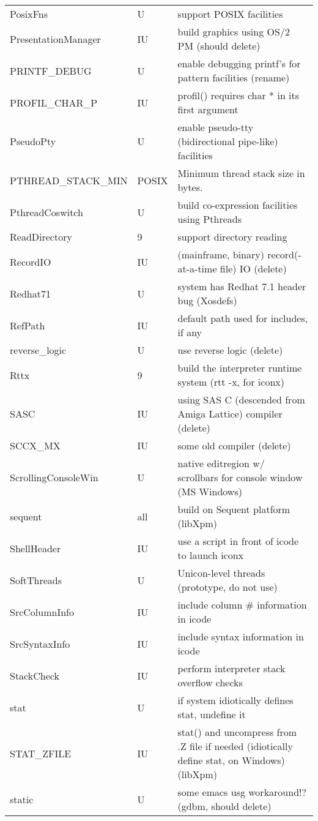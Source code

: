 \begin{xtabular}{|m{1.8in}|m{0.5in}|m{4.0in}|}
PosixFns & U & support POSIX facilities \\
PresentationManager & IU & build graphics using OS/2 PM (should delete) \\
PRINTF\_DEBUG & U & enable debugging printf's for pattern facilities (rename) \\
PROFIL\_CHAR\_P & IU & profil() requires char * in its first argument \\
PseudoPty & U & enable pseudo-tty (bidirectional pipe-like) facilities \\
PTHREAD\_STACK\_MIN & POSIX & Minimum thread stack size in bytes. \\
PthreadCoswitch & U & build co-expression facilities using Pthreads \\
ReadDirectory & 9 & support directory reading \\
RecordIO & IU & (mainframe, binary) record(-at-a-time file) IO (delete) \\
Redhat71 & U & system has Redhat 7.1 header bug (Xosdefs) \\
RefPath & IU & default path used for includes, if any \\
reverse\_logic & U & use reverse logic (delete) \\
Rttx & 9 & build the interpreter runtime system (rtt -x, for iconx) \\
SASC & IU & using SAS C (descended from Amiga Lattice) compiler (delete) \\
SCCX\_MX & IU & some old compiler (delete) \\
ScrollingConsoleWin & U & native editregion w/ scrollbars for console window (MS Windows) \\
sequent & all & build on Sequent platform (libXpm) \\
ShellHeader & IU & use a script in front of icode to launch iconx \\
SoftThreads & U & Unicon-level threads (prototype, do not use) \\
SrcColumnInfo & IU & include column \# information in icode \\
SrcSyntaxInfo & IU & include syntax information in icode \\
StackCheck & IU & perform interpreter stack overflow checks \\
stat & U & if system idiotically defines stat, undefine it \\
STAT\_ZFILE & IU & stat() and uncompress from .Z file if needed (idiotically define stat, on Windows) (libXpm) \\
static & U & some emacs usg workaround!? (gdbm, should delete) \\

\end{xtabular}
